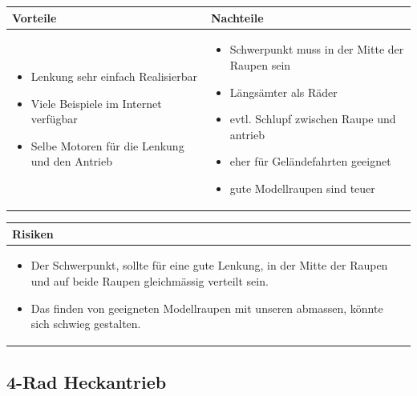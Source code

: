 \begin{table}[h]
\begin{tabular}{p{} | p{}}


 \textbf{Vorteile} & \textbf{Nachteile} \\ \hline
	 
\begin{itemize}
\item Lenkung sehr einfach Realisierbar
\item Viele Beispiele im Internet verfügbar
\item Selbe Motoren für die Lenkung und den Antrieb
\end{itemize}

 
 &
 
\begin{itemize}
\item Schwerpunkt muss in der Mitte der Raupen sein
\item Längsämter als Räder
\item evtl. Schlupf zwischen Raupe und antrieb
\item eher für Geländefahrten geeignet
\item gute Modellraupen sind teuer
\end{itemize}

\end{tabular}
\end{table}

\begin{table}[h]
\begin{tabular}{p{}p{}}


 \textbf{Risiken} & \\ \hline
	 
\begin{itemize}
\item Der Schwerpunkt, sollte für eine gute Lenkung, in der Mitte der Raupen und auf beide Raupen gleichmässig verteilt sein.
\item Das finden von geeigneten Modellraupen mit unseren abmassen, könnte sich schwieg gestalten.
\end{itemize}


 
\end{tabular}
\end{table}

\pagebreak


\subsection{4-Rad Heckantrieb}

